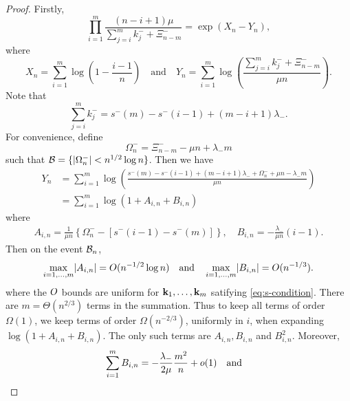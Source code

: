 \begin{proof}
    Firstly,
    \begin{equation*}
        \prod_{i=1}^m \frac{(n-i+1)\mu}{\sum_{j=i}^m k_j^- + \Xi^-_{n-m}} = \exp(X_n - Y_n),
    \end{equation*}
    where
    \begin{equation*}
        X_n = \sum_{i=1}^m \log\left( 1 - \frac{i-1}{n} \right)
        \quad \text{and} \quad
        Y_n = \sum_{i=1}^m \log\left( \frac{\sum_{j=i}^m k_j^- + \Xi^-_{n-m}}{\mu n} \right).
    \end{equation*}
    Note that
    \begin{equation*}
        \sum_{j=i}^m k^-_j = s^-(m) - s^-(i - 1) + (m - i + 1) \lambda_-.
    \end{equation*}
    For convenience, define
    \begin{equation*}
        \Omega^-_n = \Xi^-_{n-m} - \mu n + \lambda_- m
    \end{equation*}
    such that $\mathcal B = \{ \lvert\Omega^-_n\rvert < n^{1/2} \log n \}$. Then we have
    \begin{align*}
        Y_n 
        &= \sum_{i=1}^m \log \left( \frac{s^-(m) - s^-(i-1) + (m - i + 1) \lambda_- + \Omega^-_n + \mu n - \lambda_- m}{\mu n} \right) \\
        &= \sum_{i=1}^m \log \left( 1 + A_{i, n} + B_{i, n} \right)
    \end{align*}
    where
    \begin{align*}
        A_{i, n} = \frac{1}{\mu n} \left\{ 
            \Omega_n^- -\left[ s^-(i-1) - s^-(m) \right] 
        \right\}, \quad
        B_{i, n} = - \frac{\lambda_-}{\mu n} (i-1).
    \end{align*}
    Then on the event $\mathcal B_n$,
    \begin{equation*}
        \max_{i=1, \ldots, m} \lvert A_{i,n}\rvert = O(n^{-1/2} \log n)
        \quad \text{and} \quad
        \max_{i=1, \ldots, m} \lvert B_{i,n}\rvert = O(n^{-1/3}).
    \end{equation*}
    where the $O$ bounds are uniform for ${\mathbf k}_1, \ldots, {\mathbf k}_m$ satifying \cref{eq:s-condition}. There are $m = \Theta(n^{2/3})$ terms in the summation. Thus to keep all terms of order $\Omega(1)$, we keep terms of order $\Omega(n^{-2/3})$, uniformly in $i$, when expanding $\log(1 + A_{i, n} + B_{i, n})$. The only such terms are $A_{i, n}, B_{i, n}$ and $B_{i, n}^2$. Moreover,
    \begin{equation*}
        \sum_{i=1}^m B_{i,n} = - \frac{\lambda_-}{2 \mu} \frac{m^2}{n} + \littleo(1) \quad \text{and} \quad

\end{equation*}
\end{proof}

